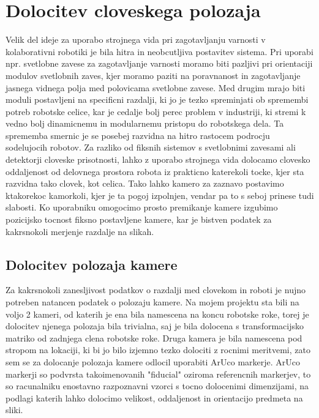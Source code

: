 \documentclass[a4paper,twoside,openright,12pt,slovene]{book}
\begin{document}
\newpage


\section{Dolocitev cloveskega polozaja} Velik del ideje za uporabo strojnega vida pri zagotavljanju varnosti v kolaborativni robotiki je bila hitra in neobcutljiva postavitev sistema. Pri uporabi npr. svetlobne zavese za zagotavljanje varnosti moramo biti pazljivi pri orientaciji modulov svetlobnih zaves, kjer moramo paziti na poravnanost in zagotavljanje jasnega vidnega polja med polovicama svetlobne zavese. Med drugim mrajo biti moduli postavljeni na specificni razdalji, ki jo je tezko spreminjati ob spremembi potreb robotske celice, kar je cedalje bolj perec problem v industriji, ki stremi k vedno bolj dinamicnemu in modularnemu pristopu do robotskega dela. Ta sprememba smernic je se posebej razvidna na hitro rastocem podrocju sodelujocih robotov. Za razliko od fiksnih sistemov s svetlobnimi zavesami ali detektorji cloveske prisotnosti, lahko z uporabo strojnega vida dolocamo clovesko oddaljenost od delovnega prostora robota iz prakticno katerekoli tocke, kjer sta razvidna tako clovek, kot celica. Tako lahko kamero za zaznavo postavimo ktakorekoc kamorkoli, kjer je ta pogoj izpolnjen, vendar pa to s seboj prinese tudi slabosti. Ko uporabniku omogocimo prosto premikanje kamere izgubimo pozicijsko tocnost fiksno postavljene kamere, kar je bistven podatek za kakrsnokoli merjenje razdalje na slikah.

\subsection{Dolocitev polozaja kamere} Za kakrsnokoli zanesljivost podatkov o razdalji med clovekom in roboti je nujno potreben natancen podatek o polozaju kamere. Na mojem projektu sta bili na voljo 2 kameri, od katerih je ena bila namescena na koncu robotske roke, torej je dolocitev njenega polozaja bila trivialna, saj je bila dolocena s transformacijsko matriko od zadnjega clena robotske roke. Druga kamera je bila namescena pod stropom na lokaciji, ki bi jo bilo izjemno tezko dolociti z rocnimi meritvemi, zato sem se za dolocanje polozaja kamere odlocil uporabiti ArUco markerje. ArUco markerji so podvrsta takoimenovanih "fiducial" oziroma referencnih markerjev, to so racunalniku enostavno razpoznavni vzorci s tocno dolocenimi dimenzijami, na podlagi katerih lahko dolocimo velikost, oddaljenost in orientacijo predmeta na sliki. 
\end{document}
